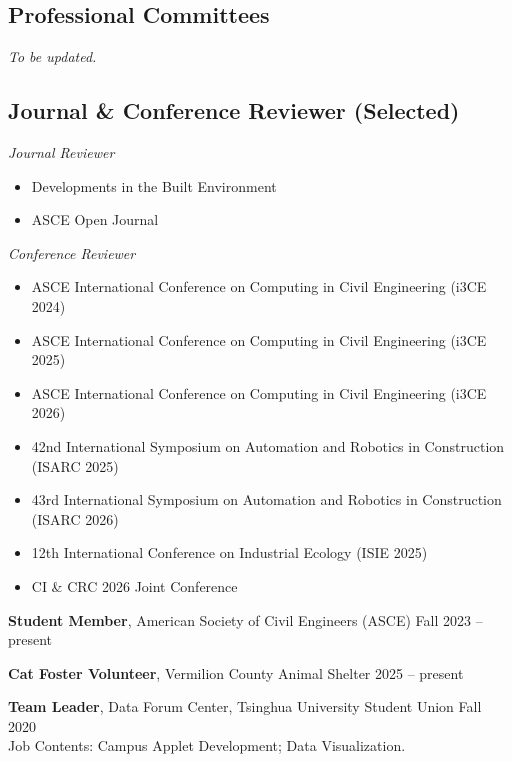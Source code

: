 \documentclass[11pt,a4paper]{article}
\newcommand{\entrytitle}[1]{\textbf{#1}}
\begin{document}
\subsection*{Professional Committees}

\textit{To be updated.}

\subsection*{Journal \& Conference Reviewer (Selected)}

\textit{Journal Reviewer}
\begin{itemize}[nosep, leftmargin=1.5em]
    \item Developments in the Built Environment
    \item ASCE Open Journal
\end{itemize}

\textit{Conference Reviewer}
\begin{itemize}[nosep, leftmargin=1.5em]
    \item ASCE International Conference on Computing in Civil Engineering (i3CE 2024)
    \item ASCE International Conference on Computing in Civil Engineering (i3CE 2025)
    \item ASCE International Conference on Computing in Civil Engineering (i3CE 2026)
    \item 42nd International Symposium on Automation and Robotics in Construction (ISARC 2025)
    \item 43rd International Symposium on Automation and Robotics in Construction (ISARC 2026)
    \item 12th International Conference on Industrial Ecology (ISIE 2025)
    \item CI \& CRC 2026 Joint Conference
\end{itemize}



\entrytitle{Student Member}, American Society of Civil Engineers (ASCE) \hfill Fall 2023 -- present


\entrytitle{Cat Foster Volunteer}, Vermilion County Animal Shelter \hfill 2025 -- present

\entrytitle{Team Leader}, Data Forum Center, Tsinghua University Student Union \hfill Fall 2020 \\
Job Contents: Campus Applet Development; Data Visualization.
\end{document}
